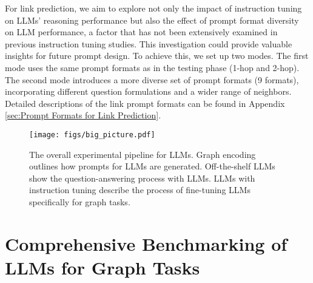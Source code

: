 For link prediction, we aim to explore not only the impact of instruction tuning on LLMs’ reasoning performance but also the effect of prompt format diversity on LLM performance, a factor that has not been extensively examined in previous instruction tuning studies. This investigation could provide valuable insights for future prompt design. To achieve this, we set up two modes. The first mode uses the same prompt formats as in the testing phase (1-hop and 2-hop). The second mode introduces a more diverse set of prompt formats (9 formats), incorporating different question formulations and a wider range of neighbors. Detailed descriptions of the link prompt formats can be found in Appendix \ref{sec:Prompt Formats for Link Prediction}.


\begin{figure*}[htbp]
  \centering
  \texttt{[image: figs/big\_picture.pdf]}  %
  \caption{The overall experimental pipeline for LLMs. Graph encoding outlines how prompts for LLMs are generated. Off-the-shelf LLMs show the question-answering process with LLMs. LLMs with instruction tuning describe the process of fine-tuning LLMs specifically for graph tasks.}
  \label{fig:The overall pipeline of our benchmark}
\end{figure*}

\section{Comprehensive Benchmarking of LLMs for Graph Tasks}
\label{sec:Fair Benchmark}

